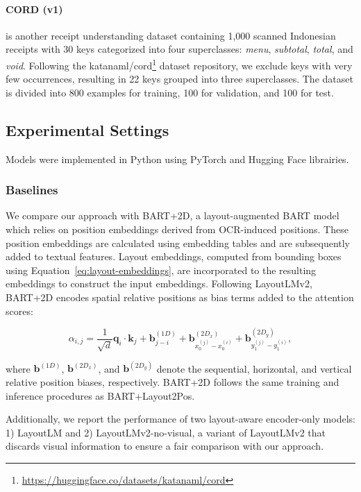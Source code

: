 \paragraph{CORD (v1)} \citep{park2019cord} is another receipt understanding dataset containing 1,000 scanned Indonesian receipts with 30 keys categorized into four superclasses: \textit{menu}, \textit{subtotal}, \textit{total}, and \textit{void}. Following the katanaml/cord\footnote{\url{https://huggingface.co/datasets/katanaml/cord}} dataset repository, we exclude keys with very few occurrences, resulting in 22 keys grouped into three superclasses. The dataset is divided into 800 examples for training, 100 for validation, and 100 for test. 

\subsection{Experimental Settings}

Models were implemented in Python using PyTorch \citep{paszke2017automatic} and Hugging Face \citep{wolf2019huggingface} librairies. 

\subsubsection{Baselines}

We compare our approach with BART+2D, a layout-augmented \ac{BART} model which relies on position embeddings derived from \ac{OCR}-induced positions. These position embeddings are calculated using embedding tables and are subsequently added to textual features. Layout embeddings, computed from bounding boxes using Equation~\ref{eq:layout-embeddings}, are incorporated to the resulting embeddings to construct the input embeddings. Following LayoutLMv2, BART+2D encodes spatial relative positions as bias terms added to the attention scores:

\begin{equation}
  \alpha_{i,j} = \dfrac{1}{\sqrt{d}} \bm{q}_i \cdot \bm{k}_j + \bm{b}^{(1D)}_{j - i} + \bm{b}^{(2D_x)}_{x^{(j)}_{0} - x^{(i)}_{0}} + \bm{b}^{(2D_y)}_{y^{(j)}_{1} - y^{(i)}_{1}},
\end{equation}

\noindent where $\bm{b}^{(1D)}$, $\bm{b}^{(2D_x)}$, and $\bm{b}^{(2D_y)}$ denote the sequential, horizontal, and vertical relative position biases, respectively. BART+2D follows the same training and inference procedures as BART+Layout2Pos.

Additionally, we report the performance of two layout-aware encoder-only models: 1) LayoutLM and 2) LayoutLMv2-no-visual, a variant of LayoutLMv2 that discards visual information to ensure a fair comparison with our approach. 

